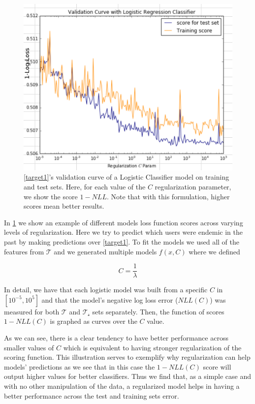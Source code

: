 \begin{figure}[h!]
\begin{center}
\includegraphics[width=0.9\columnwidth]{figures/regularization/figure-log_loss_error_validation_curve.png}
\caption{ \cref{target1}'s validation curve of a Logistic Classifier model on training and test sets. Here, for each value of the $C$ regularization parameter, we show the score $1 - NLL$. Note that with this formulation, higher scores mean better results.}
\label{fig:log_loss_regularization_validation_curve}
\end{center}
\end{figure}

In \cref{fig:log_loss_regularization_validation_curve} we show an example of different models loss function scores across varying levels of regularization.
Here we try to predict which users were endemic in the past by making predictions over \cref{target1}.
To fit the models we used all of the features from $\mathcal{T}$ and we generated multiple models $f(x,C)$ where we defined

$$C = \frac{1}{\lambda} $$

In detail, we have that each logistic model was built from a specific $C$ in  $[10^{-5},10^5]$ and that the model's negative log loss error ($NLL(C)$) was measured for both $\mathcal{T}$ and $\mathcal{T_s}$ sets separately.
Then, the function of scores $1-NLL(C)$ is graphed as curves over the $C$ value.

As we can see, there is a clear tendency to have better performance across smaller values of $C$ which is equivalent to having stronger regularization of the scoring function.
This illustration serves to exemplify why regularization can help models' predictions as we see that in this case the $1-NLL(C)$ score will output higher values for better classifiers.
Thus we find that, as a simple case and with no other manipulation of the data, a regularized model helps in having a better performance across the test and training sets error.


